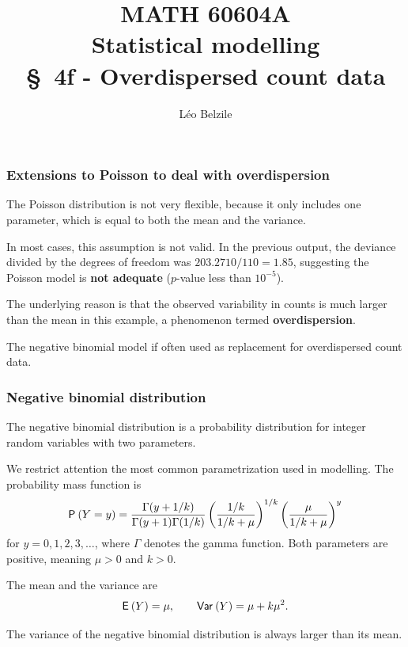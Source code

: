 \documentclass{beamer}
\title[\color{white}{MATH 60604A \S~4f - Overdispersed count data}]{\texorpdfstring{MATH 60604A \\Statistical modelling \\ \S~4f - Overdispersed count data}{MATH 60604A \\Statistical modelling \\ \S~4f - Overdispersed count data}}
\author{Léo Belzile}
\institute{HEC Montréal\\
Department of Decision Sciences}
\date{}
\begin{document}
\frame{\titlepage}

\begin{frame}[fragile]
\frametitle{Extensions to Poisson to deal with overdispersion}
\bi
\item The Poisson distribution is not very flexible, because it only includes one parameter, which is equal to both the mean and the variance.
\item In most cases, this assumption is not valid. In the previous output, the deviance divided by the degrees of freedom was $203.2710/110 = 1.85$, suggesting  the Poisson model is \textbf{not adequate} ($p$-value less than $10^{-5}$).
\item The underlying reason is that the observed variability in counts is much larger than the mean in this example, a phenomenon termed \textbf{overdispersion}.
\item The \alert{negative binomial} model if often used as replacement for overdispersed count data.
\ei
\end{frame}


\begin{frame}[fragile]
\frametitle{Negative binomial distribution}
\bi
\item The negative binomial distribution is a probability distribution for \alert{integer} random variables with two parameters.
\item We restrict attention the most common parametrization used in modelling. The probability mass function is
\begin{align*}
\P{Y=y}=\frac{\Gamma(y+1/k)}{\Gamma(y+1)\Gamma(1/k)} \left(\frac{1/k}{1/k + \mu} \right)^{1/k} \left(\frac{\mu}{1/k+\mu}\right)^y
\end{align*}
for $y=0, 1, 2, 3, \ldots$, where $\Gamma$ denotes the gamma function. Both parameters are positive, meaning $\mu>0$ and $k>0$.

\item The mean and the variance are \begin{align*}
\E{Y}=\mu, \qquad \Va{Y}=\mu+k\mu^2.                                 \end{align*}
\item The variance of the negative binomial distribution is always \alert{larger} than its mean. 
\ei
\end{frame}
\end{document}
